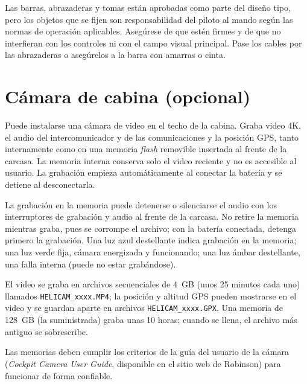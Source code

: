 Las barras, abrazaderas y tomas están aprobadas como parte del diseño tipo, pero los objetos que se fijen son responsabilidad del piloto al mando según las normas de operación aplicables. Asegúrese de que estén firmes y de que no interfieran con los controles ni con el campo visual principal. Pase los cables por las abrazaderas o asegúrelos a la barra con amarras o cinta.

\section{Cámara de cabina (opcional)}

Puede instalarse una cámara de video en el techo de la cabina. Graba video 4K, el audio del intercomunicador y de las comunicaciones y la posición GPS, tanto internamente como en una memoria \emph{flash} removible insertada al frente de la carcasa. La memoria interna conserva solo el video reciente y no es accesible al usuario. La grabación empieza automáticamente al conectar la batería y se detiene al desconectarla.

La grabación en la memoria puede detenerse o silenciarse el audio con los interruptores de grabación y audio al frente de la carcasa. No retire la memoria mientras graba, pues se corrompe el archivo; con la batería conectada, detenga primero la grabación. Una luz azul destellante indica grabación en la memoria; una luz verde fija, cámara energizada y funcionando; una luz ámbar destellante, una falla interna (puede no estar grabándose).

El video se graba en archivos secuenciales de 4~GB (unos 25 minutos cada uno) llamados \texttt{HELICAM\_xxxx.MP4}; la posición y altitud GPS pueden mostrarse en el video y se guardan aparte en archivos \texttt{HELICAM\_xxxx.GPX}. Una memoria de 128~GB (la suministrada) graba unas 10 horas; cuando se llena, el archivo más antiguo se sobrescribe.

\begin{nota}
Las memorias deben cumplir los criterios de la guía del usuario de la cámara (\emph{Cockpit Camera User Guide}, disponible en el sitio web de Robinson) para funcionar de forma confiable.
\end{nota}
